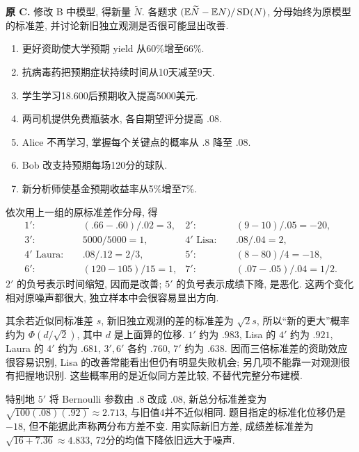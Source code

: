 \begin{exercise}\label{ex:P9.C}
\textbf{原 C.} 修改 B 中模型, 得新量 $\widetilde N$. 各题求 $(\mathbb E\widetilde N-\mathbb E N)/\operatorname{SD}(N)$, 分母始终为原模型的标准差, 并讨论新旧独立观测是否很可能显出改善.
\begin{enumerate}[label=\arabic*$'$.]
\item\label{part:P9.C.1'} 更好资助使大学预期 yield 从60\%增至66\%.
\item\label{part:P9.C.2'} 抗病毒药把预期症状持续时间从10天减至9天.
\item\label{part:P9.C.3'} 学生学习18.600后预期收入提高5000美元.
\item\label{part:P9.C.4'} 两司机提供免费瓶装水, 各自期望评分提高 $.08$.
\item\label{part:P9.C.5'} Alice 不再学习, 掌握每个关键点的概率从 $.8$ 降至 $.08$.
\item\label{part:P9.C.6'} Bob 改支持预期每场120分的球队.
\item\label{part:P9.C.7'} 新分析师使基金预期收益率从5\%增至7\%.
\end{enumerate}
\end{exercise}
\begin{solution}\label{sol:P9.C}
依次用上一组的原标准差作分母, 得
\begin{align*}
 1':&\quad(.66-.60)/.02=3, &2':&\quad(9-10)/.05=-20,\\
 3':&\quad5000/5000=1, &4'\text{ Lisa}:&\quad.08/.04=2,\\
 4'\text{ Laura}:&\quad.08/.12=2/3, &5':&\quad(8-80)/4=-18,\\
 6':&\quad(120-105)/15=1, &7':&\quad(.07-.05)/.04=1/2.
\end{align*}
$2'$ 的负号表示时间缩短, 因而是改善; $5'$ 的负号表示成绩下降, 是恶化. 这两个变化相对原噪声都很大, 独立样本中会很容易显出方向.

其余若近似同标准差 $s$, 新旧独立观测的差的标准差为 $\sqrt2s$, 所以“新的更大”概率约为 $\Phi(d/\sqrt2)$, 其中 $d$ 是上面算的位移. $1'$ 约为 $.983$, Lisa 的 $4'$ 约为 $.921$, Laura 的 $4'$ 约为 $.681$, $3',6'$ 各约 $.760$, $7'$ 约为 $.638$. 因而三倍标准差的资助效应很容易识别, Lisa 的改善常能看出但仍有明显失败机会; 另几项不能靠一对观测很有把握地识别. 这些概率用的是近似同方差比较, 不替代完整分布建模.

特别地 $5'$ 将 Bernoulli 参数由 $.8$ 改成 $.08$, 新总分标准差变为 $\sqrt{100(.08)(.92)}\approx2.713$, 与旧值4并不近似相同. 题目指定的标准化位移仍是 $-18$, 但不能据此声称两分布方差不变. 用实际新旧方差, 成绩差标准差为 $\sqrt{16+7.36}\approx4.833$, 72分的均值下降依旧远大于噪声.
\end{solution}

